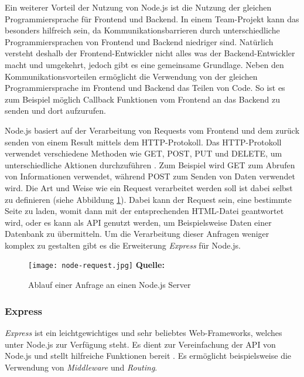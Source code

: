 Ein weiterer Vorteil der Nutzung von Node.js ist die Nutzung der gleichen Programmiersprache für Frontend und Backend.
In einem Team-Projekt kann das besonders hilfreich sein, da Kommunikationsbarrieren durch unterschiedliche Programmiersprachen von Frontend und Backend niedriger sind. Natürlich versteht deshalb der Frontend-Entwickler nicht alles was  der Backend-Entwickler macht und umgekehrt, jedoch gibt es eine gemeinsame Grundlage. Neben den Kommunikationsvorteilen ermöglicht die Verwendung von der gleichen Programmiersprache im Frontend und Backend das Teilen von Code. So ist es zum Beispiel möglich Callback Funktionen vom Frontend an das Backend zu senden und dort aufzurufen.

Node.js basiert auf der Verarbeitung von Requests vom Frontend und dem zurück senden von einem Result mittels dem HTTP-Protokoll. Das HTTP-Protokoll verwendet verschiedene Methoden wie GET, POST, PUT und DELETE, um unterschiedliche Aktionen durchzuführen  \cite{expressbook}. Zum Beispiel wird GET zum Abrufen von Informationen verwendet, während POST zum Senden von Daten verwendet wird. Die Art und Weise wie ein Request verarbeitet werden soll ist dabei selbst zu definieren (siehe Abbildung \ref{fig:node-request}). Dabei kann der Request sein, eine bestimmte Seite zu laden, womit dann mit der entsprechenden HTML-Datei geantwortet wird, oder es kann als API genutzt werden, um Beispielsweise Daten einer Datenbank zu übermitteln. Um die Verarbeitung dieser Anfragen weniger komplex zu gestalten gibt es die Erweiterung \textit{Express} für Node.js.

  

  \begin{figure}[ht]
  \centering
  \texttt{[image: node-request.jpg]}
\raggedleft
    \footnotesize\sffamily\textbf{Quelle:} \cite{expressbook}
  \caption{Ablauf einer Anfrage an einen Node.js Server}
  \label{fig:node-request}
\end{figure}


\subsubsection{Express}
\label{sec:express}
\textit{Express} ist ein leichtgewichtiges und sehr beliebtes Web-Frameworks, welches unter Node.js zur Verfügung steht. Es dient zur Vereinfachung der API von Node.js und stellt hilfreiche Funktionen bereit \cite{expressbook}. Es ermöglicht beispielsweise die Verwendung von \textit{Middleware} und \textit{Routing}.

